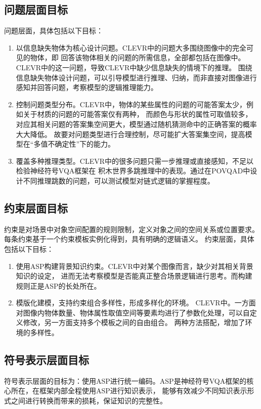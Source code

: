 \subsection{问题层面目标}
问题层面，具体包括以下目标：
\begin{enumerate}[nosep]
\item 以信息缺失物体为核心设计问题。CLEVR中的问题大多围绕图像中的完全可见的物体，即
回答该物体相关的问题的所需信息，全部都包括在图像中。CLEVR中的这一问题，导致CLEVR中缺少信息缺失的情境下的推理。
围绕信息缺失物体设计问题，可以引导模型进行推理、归纳，而非直接对图像进行感知并回答问题，考察模型的逻辑推理能力。
\item 控制问题类型分布。CLEVR中，物体的某些属性的问题的可能答案太少，例如关于材质的问题的可能答案仅有两种，
而颜色与形状的属性可取值较多，对应其相关问题的答案集空间更大，模型通过随机猜测命中的正确答案的概率大大降低。
故要对问题类型进行合理控制，尽可能扩大答案集空间，提高模型在“多值不确定性”下的能力。
\item 覆盖多种推理类型。CLEVR中的很多问题只需一步推理或直接感知，不足以检验神经符号VQA框架在
积木世界多跳推理中的表现。通过在POVQAD中设计不同推理跳数的问题，可以测试模型对链式逻辑的掌握程度。
\end{enumerate}
\subsection{约束层面目标}
约束是对场景中对象空间配置的规则限制，定义对象之间的空间关系或位置要求。
每条约束基于一个约束模板实例化得到，具有明确的逻辑语义。
约束层面，具体包括以下目标：
\begin{enumerate}[nosep]
\item 使用ASP构建背景知识约束。CLEVR中对某个图像而言，缺少对其相关背景知识的设定，
进而无法考察模型是否能真正整合场景逻辑进行思考。而构建规则正是ASP的长处所在。
\item 模版化建模，支持约束组合多样性，形成多样化的环境。
CLEVR中。一方面对图像内物体数量、物体属性取值空间等要素均进行了参数化处理，可以自定义修改，另一方面支持多个模板之间的自由组合。
两种方法搭配，增加了环境的多样性。
\end{enumerate}
\subsection{符号表示层面目标}
符号表示层面的目标为：使用ASP进行统一编码。ASP是神经符号VQA框架的核心所在，在框架内部全程使用ASP进行知识表示，
能够有效减少不同知识表示形式之间进行转换而带来的损耗，保证知识的完整性。
